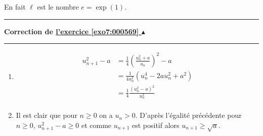 \documentclass[11pt,a4paper]{article}
\newcounter{exo}
\newcommand{\correction}[1]{\hypertarget{cor7:#1}{}\label{cor7:#1}{\bf Correction de \hyperlink{exo7:#1}{l'exercice \ref{exo7:#1} $\blacktriangle$}}\vspace{1mm}\hrule\vspace{1mm}}
\newcommand{\fincorrection}{\vspace{1mm}\hrule\vspace*{7mm}}
\begin{document}
En fait $\ell$ est le nombre $e = \exp(1)$.
\fincorrection
\correction{000569}
\begin{enumerate}
\item \begin{align*}
       u_{n+1}^2-a &= \frac14\left(\frac{u_n^2+a}{u_n}\right)^2-a\\
                   &= \frac1{4u_n^2}(u_n^4-2au_n^2+a^2)\\
                   &= \frac14 \frac{(u_n^2-a)^2}{u_n^2}\\
  \end{align*}
\item Il est clair que pour $n\geqslant 0$ on a $u_n > 0$.
D'apr\`es l'\'egalit\'e pr\'ec\'edente pour $n\geqslant 0$, $u_{n+1}^2-a \geqslant 0$ et
comme $ u_{n+1}$ est positif alors $u_{n+1}\geqslant \sqrt a$.


\end{enumerate}
\end{document}
